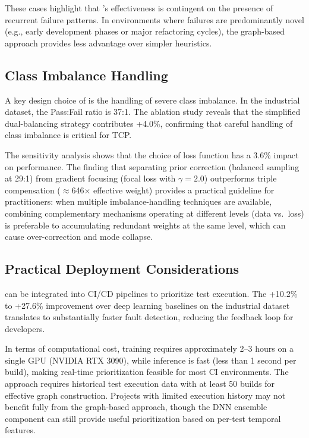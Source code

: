 These cases highlight that \filopriori{}'s effectiveness is contingent on the
presence of recurrent failure patterns. In environments where failures are
predominantly novel (e.g., early development phases or major refactoring
cycles), the graph-based approach provides less advantage over simpler
heuristics.

\subsection{Class Imbalance Handling}

A key design choice of \filopriori{} is the handling of severe class imbalance.
In the industrial dataset, the Pass:Fail ratio is 37:1. The ablation study
reveals that the simplified dual-balancing strategy contributes +4.0\%,
confirming that careful handling of class imbalance is critical for TCP.

The sensitivity analysis shows that the choice of loss function has a 3.6\%
impact on performance. The finding that separating prior correction (balanced
sampling at 29:1) from gradient focusing (focal loss with $\gamma = 2.0$)
outperforms triple compensation ($\approx$646$\times$
effective weight) provides a practical guideline for practitioners: when
multiple imbalance-handling techniques are available, combining
complementary mechanisms operating at different levels (data vs.\ loss)
is preferable to accumulating redundant weights at the same level, which can
cause over-correction and mode collapse.

\subsection{Practical Deployment Considerations}

\filopriori{} can be integrated into CI/CD pipelines to prioritize test
execution. The +10.2\% to +27.6\% improvement over deep learning baselines on
the industrial dataset translates to substantially faster fault detection,
reducing the feedback loop for developers.

In terms of computational cost, training requires approximately 2--3 hours on
a single GPU (NVIDIA RTX 3090), while inference is fast (less than 1 second
per build), making real-time prioritization feasible for most CI environments.
The approach requires historical test execution data with at least 50 builds
for effective graph construction. Projects with limited execution history may
not benefit fully from the graph-based approach, though the DNN ensemble
component can still provide useful prioritization based on per-test temporal
features.

